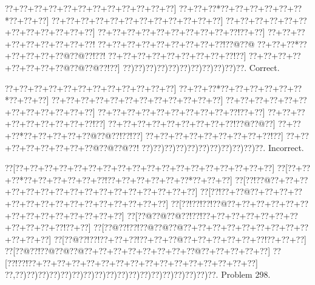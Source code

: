 \documentclass[a5paper]{article}
\begin{document}
\begin{center}
{\goo
\0??+\0??+\0??+\0??+\0??+\0??+\0??+\0??+\0??+\0??+\0??+\0??]
\0??+\0??+\0??*\0??+\0??+\0??+\0??+\0??+\0??*\0??+\0??+\0??]
\0??+\0??+\0??+\0??+\0??+\0??+\0??+\0??+\0??+\0??+\0??+\0??]
\0??+\0??+\0??+\0??+\0??+\0??+\0??+\0??+\0??+\0??+\0??+\0??]
\0??+\0??+\0??+\0??+\0??+\0??+\0??+\0??+\0??+\0??!\0??+\0??]
\0??+\0??+\0??+\0??+\0??+\0??+\0??+\0??+\0??!
\0??+\0??+\0??+\0??+\0??+\0??+\0??+\0??+\0??!\0??@\0??@
\0??+\0??+\0??*\0??+\0??+\0??+\0??+\0??@\0??@\0??!\0??!
\0??+\0??+\0??+\0??+\0??+\0??+\0??+\0??+\0??!\0??]
\0??+\0??+\0??+\0??+\0??+\0??+\0??+\0??@\0??@\0??@\0??!\0??]
\0??)\0??)\0??)\0??)\0??)\0??)\0??)\0??)\0??)\0??)\0??.
}
Correct. 

\end{center}
\begin{center}
{\goo
\0??+\0??+\0??+\0??+\0??+\0??+\0??+\0??+\0??+\0??+\0??+\0??]
\0??+\0??+\0??*\0??+\0??+\0??+\0??+\0??+\0??*\0??+\0??+\0??]
\0??+\0??+\0??+\0??+\0??+\0??+\0??+\0??+\0??+\0??+\0??+\0??]
\0??+\0??+\0??+\0??+\0??+\0??+\0??+\0??+\0??+\0??+\0??+\0??]
\0??+\0??+\0??+\0??+\0??+\0??+\0??+\0??+\0??+\0??!\0??+\0??]
\0??+\0??+\0??+\0??+\0??+\0??+\0??+\0??+\0??!\0??]
\0??+\0??+\0??+\0??+\0??+\0??+\0??+\0??+\0??!\0??@\0??@\0??]
\0??+\0??+\0??*\0??+\0??+\0??+\0??+\0??@\0??@\0??!\0??!\0??]
\0??+\0??+\0??+\0??+\0??+\0??+\0??+\0??+\0??!\0??]
\0??+\0??+\0??+\0??+\0??+\0??+\0??+\0??@\0??@\0??@\0??!
\0??)\0??)\0??)\0??)\0??)\0??)\0??)\0??)\0??)\0??)\0??.
}
Incorrect. 

\end{center}
\newpage
\begin{center}
{\goo
\0??[\0??+\0??+\0??+\0??+\0??+\0??+\0??+\0??+\0??+\0??+\0??+\0??+\0??+\0??+\0??+\0??+\0??+\0??]
\0??[\0??+\0??+\0??*\0??+\0??+\0??+\0??+\0??+\0??!\0??+\0??+\0??+\0??+\0??+\0??*\0??+\0??+\0??]
\0??[\0??!\0??@\0??+\0??+\0??+\0??+\0??+\0??+\0??+\0??+\0??+\0??+\0??+\0??+\0??+\0??+\0??+\0??]
\0??[\0??!\0??+\0??@\0??+\0??+\0??+\0??+\0??+\0??+\0??+\0??+\0??+\0??+\0??+\0??+\0??+\0??+\0??]
\0??[\0??!\0??!\0??!\0??@\0??+\0??+\0??+\0??+\0??+\0??+\0??+\0??+\0??+\0??+\0??+\0??+\0??+\0??]
\0??[\0??@\0??@\0??@\0??!\0??!\0??+\0??+\0??+\0??+\0??+\0??+\0??+\0??+\0??+\0??+\0??!\0??+\0??]
\0??[\0??@\0??!\0??!\0??@\0??@\0??@\0??+\0??+\0??+\0??+\0??+\0??+\0??+\0??+\0??+\0??+\0??+\0??]
\0??[\0??@\0??!\0??!\0??+\0??+\0??!\0??+\0??+\0??@\0??+\0??+\0??+\0??+\0??+\0??!\0??+\0??+\0??]
\0??[\0??@\0??!\0??@\0??@\0??@\0??+\0??+\0??+\0??+\0??+\0??+\0??+\0??@\0??+\0??+\0??+\0??+\0??]
\0??[\0??!\0??!\0??+\0??+\0??+\0??+\0??+\0??+\0??+\0??+\0??+\0??+\0??+\0??+\0??+\0??+\0??+\0??]
\0??,\0??)\0??)\0??)\0??)\0??)\0??)\0??)\0??)\0??)\0??)\0??)\0??)\0??)\0??)\0??)\0??)\0??)\0??.
}
Problem 298.

\end{center}
\end{document}
